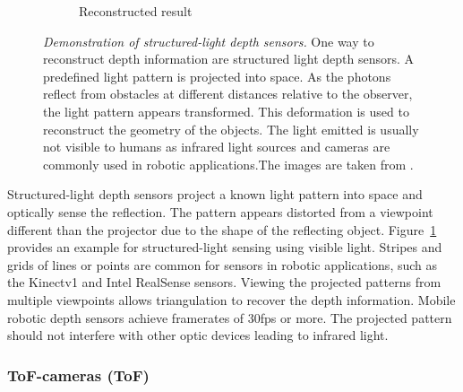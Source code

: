\begin{figure}[H]
\begin{subfigure}[t]{0.45\textwidth}
        \caption{Reconstructed result}
    \end{subfigure}
    \caption[Demonstration of structured-light depth sensors]{\emph{Demonstration of structured-light depth sensors.} One way to reconstruct depth information are structured light depth sensors. A predefined light pattern is projected into space. As the photons reflect from obstacles at different distances relative to the observer, the light pattern appears transformed. This deformation is used to reconstruct the geometry of the objects. The light emitted is usually not visible to humans as infrared light sources and cameras are commonly used in robotic applications.The images are taken from \cite{sl_depthsensor_calibration}.}\label{fig:sl_face}
\end{figure}
Structured-light depth sensors project a known light pattern into space and optically sense the reflection.
The pattern appears distorted from a viewpoint different than the projector due to the shape of the reflecting object.
Figure~\ref{fig:sl_face} provides an example for structured-light sensing using visible light.
Stripes and grids of lines or points are common for sensors in robotic applications, such as the Kinectv1 and Intel RealSense\cite{intel_realsense} sensors.
Viewing the projected patterns from multiple viewpoints allows triangulation to recover the depth information.
Mobile robotic depth sensors achieve framerates of 30fps or more.
The projected pattern should not interfere with other optic devices leading to infrared light.

\subsubsection{\acrlong{ToF}-cameras (\acrshort{ToF})}

